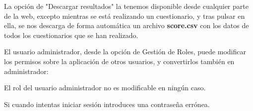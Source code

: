 La opción de "Descargar resultados" la tenemos disponible desde cualquier parte de la web, excepto mientras se está realizando un cuestionario, y tras pulsar en ella, se nos descarga de forma automática un archivo \textbf{score.csv} con los datos de todos los cuestionarios que se han realizado.

El usuario administrador, desde la opción de Gestión de Roles, puede modificar los permisos sobre la aplicación de otros usuarios, y convertirlos también en administrador:


El rol del usuario administrador no es modificable en ningún caso.

Si cuando intentas iniciar sesión introduces una contraseña errónea.



